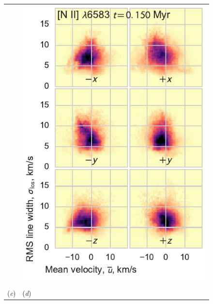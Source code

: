 \documentclass[useAMS,usenatbib]{mn2e}
\begin{document}
\begin{figure}
\begin{tabular}{@{}ll@{}}
    & \includegraphics{hist-vmean-sig-0015-N26584}\\
    \\
    (\textit{c}) & (\textit{d}) \\

\end{tabular}
\end{figure}
\end{document}
